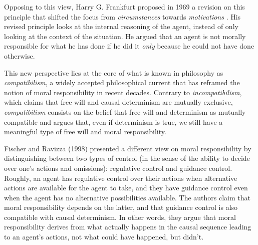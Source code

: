 \documentclass{article}
\begin{document}
Opposing to this view, Harry G. Frankfurt proposed in 1969 a revision on this principle that shifted the focus from \textit{circumstances} towards \textit{motivations} \cite{frankfurt_alternate_2003}. His revised principle looks at the internal reasoning of the agent, instead of only looking at the context of the situation. He argued that an agent is not morally responsible for what he has done if he did it \textit{only} because he could not have done otherwise.

This new perspective lies at the core of what is known in philosophy as \textit{compatibilism}, a widely accepted philosophical current that has reframed the notion of moral responsibility in recent decades. Contrary to \textit{incompatibilism}, which claims that free will and causal determinism are mutually exclusive, \textit{compatibilism} consists on the belief that free will and determinism as mutually compatible and argues that, even if determinism is true, we still have a meaningful type of free will and moral responsibility.


Fischer and Ravizza (1998) \cite{fischer_responsibility_1998} presented a different view on moral responsibility by distinguishing between two types of control (in the sense of the ability to decide over one's actions and omissions): regulative control and guidance control. Roughly, an agent has regulative control over their actions when alternative actions are available for the agent to take, and they have guidance control even when the agent has no alternative possibilities available. The authors claim that moral responsibility depends on the latter, and that guidance control is also compatible with causal determinism. In other words, they argue that moral responsibility derives from what actually happens in the causal sequence leading to an agent's actions, not what could have happened, but didn't.
\end{document}
